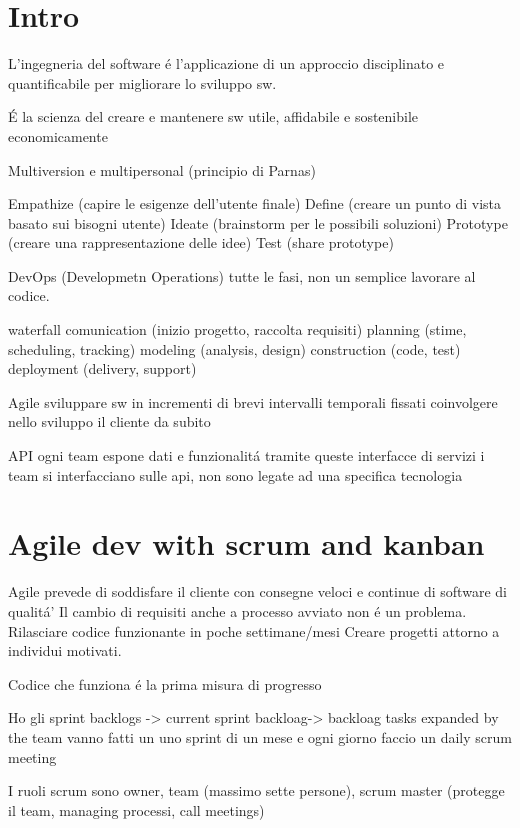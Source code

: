 \section{Intro}
L'ingegneria del software \'e l'applicazione di un approccio disciplinato e 
quantificabile per migliorare lo sviluppo sw.

\'E la scienza del creare e mantenere sw utile, affidabile e sostenibile economicamente

Multiversion e multipersonal (principio di Parnas)

Empathize (capire le esigenze dell'utente finale)
Define (creare un punto di vista basato sui bisogni utente)
Ideate (brainstorm per le possibili soluzioni)
Prototype (creare una rappresentazione delle idee)
Test (share prototype)

DevOps (Developmetn Operations)
tutte le fasi, non un semplice lavorare al codice.

waterfall
comunication (inizio progetto, raccolta requisiti)
planning (stime, scheduling, tracking)
modeling (analysis, design)
construction (code, test)
deployment (delivery, support)

Agile 
sviluppare sw in incrementi di brevi intervalli temporali fissati
coinvolgere nello sviluppo il cliente da subito

API 
ogni team espone dati e funzionalit\'a tramite queste interfacce di servizi
i team si interfacciano sulle api, non sono legate ad una specifica tecnologia

\section{Agile dev with scrum and kanban}

Agile prevede di soddisfare il cliente con consegne veloci e continue di 
software di qualit\'a'
Il cambio di requisiti anche a processo avviato non \'e un problema.
Rilasciare codice funzionante in poche settimane/mesi
Creare progetti attorno a individui motivati.

Codice che funziona \'e la prima misura di progresso

Ho gli sprint backlogs -> current sprint backloag-> backloag tasks expanded by the team 
vanno fatti un uno sprint di un mese e ogni giorno faccio un daily scrum meeting

I ruoli scrum sono owner, team (massimo sette persone), scrum master 
(protegge il team, managing processi, call meetings)

